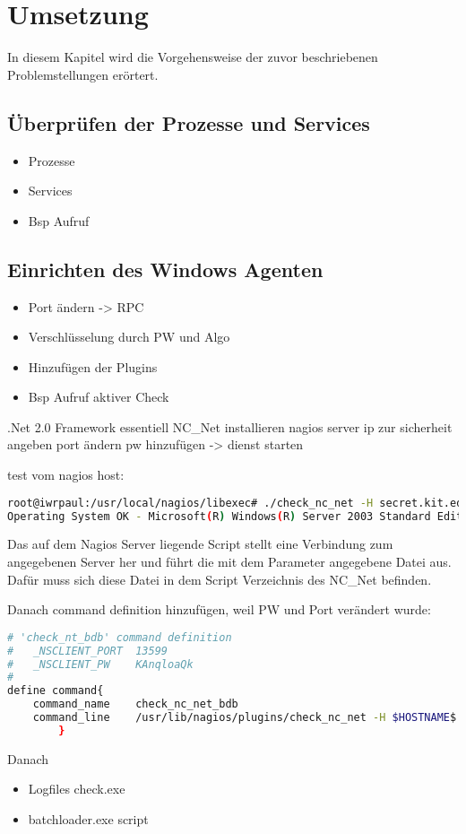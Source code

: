 \section{Umsetzung}
In diesem Kapitel wird die Vorgehensweise der zuvor beschriebenen Problemstellungen erörtert.

\subsection{Überprüfen der Prozesse und Services}
\begin{itemize}
\item Prozesse
\item Services
\item Bsp Aufruf
\end{itemize}

\subsection{Einrichten des Windows Agenten}
\begin{itemize}
\item Port ändern -> RPC
\item Verschlüsselung durch PW und Algo
\item Hinzufügen der Plugins
\item Bsp Aufruf aktiver Check
\end{itemize}

.Net 2.0 Framework essentiell
NC\_Net installieren
nagios server ip zur sicherheit angeben
port ändern
pw hinzufügen
-> dienst starten

test vom nagios host:

\begin{lstlisting}[captionpos=b, caption=Aufruf eines aktiven Checks, label=activecheckexample, breaklines = true, language=bash]
root@iwrpaul:/usr/local/nagios/libexec# ./check_nc_net -H secret.kit.edu -p 123456 -s secret -v RUNSCRIPT -l check_uname.exe
Operating System OK - Microsoft(R) Windows(R) Server 2003 Standard Edition Service Pack 2
\end{lstlisting}

Das auf dem Nagios Server liegende Script  stellt eine Verbindung zum angegebenen Server her und führt die mit dem Parameter  angegebene Datei aus. Dafür muss sich diese Datei in dem Script Verzeichnis des NC\_Net befinden.


Danach command definition hinzufügen, weil PW und Port verändert wurde:
\begin{lstlisting}[captionpos=b, caption=Nagios-Befehls Definition für den Host, label=activecheckexample, breaklines = true, language=bash]
# 'check_nt_bdb' command definition
#	_NSCLIENT_PORT	13599
#	_NSCLIENT_PW	KAnqloaQk
#
define command{
    command_name    check_nc_net_bdb
	command_line 	/usr/lib/nagios/plugins/check_nc_net -H $HOSTNAME$ -p 13599 -s KAnqloaQk -v $ARG1$
        }
\end{lstlisting}

Danach
\begin{itemize}
\item Logfiles check.exe 
\item batchloader.exe script
\end{itemize}